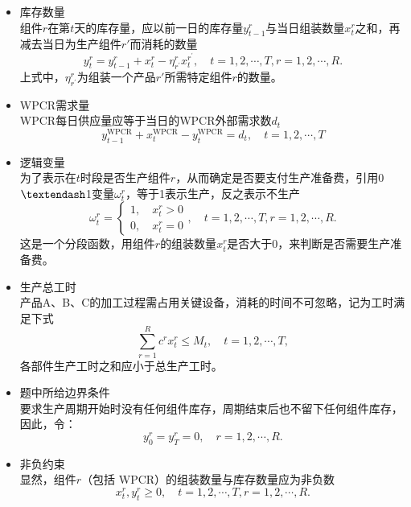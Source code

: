 \begin{itemize}
	\item 库存数量\\
	组件$r$在第$t$天的库存量，应以前一日的库存量$y_{t-1}^{r}$与当日组装数量$x_{t}^{r}$之和，再减去当日为生产组件$r'$而消耗的数量
	\begin{equation}
		y_{t}^{r}=y_{t-1}^{r}+x_{t}^{r}-\eta_{r^{\prime}}^{r} x_{t}^{r^{\prime}},\quad t=1,2, \cdots, T, r=1,2, \cdots, R.
	\end{equation}
	上式中，$\eta_{r^{\prime}}^{r}$为组装一个产品$r'$所需特定组件$r$的数量。

	\item WPCR需求量\\
	WPCR每日供应量应等于当日的WPCR外部需求数$d_t$
	\begin{equation}
		y_{t-1}^{\mathrm{WPCR}}+x_{t}^{\mathrm{WPCR}}-y_{t}^{\mathrm{WPCR}}=d_{t}, \quad t=1,2, \cdots, T
	\end{equation}

	\item 逻辑变量\\
	为了表示在$t$时段是否生产组件$r$，从而确定是否要支付生产准备费，引用0$\textendash$1变量$\omega_{t}^{r}$，等于1表示生产，反之表示不生产
	\begin{equation}\label{key1}
		\omega_{t}^{r}=\left\{\begin{array}{l}
		1, \quad x_{t}^{r}>0 \\
		0, \quad x_{t}^{r}=0
		\end{array},\quad t=1,2, \cdots, T, r=1,2, \cdots, R.\right.
	\end{equation}
	这是一个分段函数，用组件$r$的组装数量$x_{t}^{r}$是否大于0，来判断是否需要生产准备费。

	\item 生产总工时\\
	产品A、B、C的加工过程需占用关键设备，消耗的时间不可忽略，记为工时满足下式
	\begin{equation}\label{key2}
		\sum_{r=1}^{R} c^{r} x_{t}^{r} \leqslant M_{t},\quad t=1,2, \cdots, T,
	\end{equation}
	各部件生产工时之和应小于总生产工时。

	\item 题中所给边界条件\\
	要求生产周期开始时没有任何组件库存，周期结束后也不留下任何组件库存，因此，令：
	\begin{equation}
		y_{0}^{r}=y_{T}^{r}=0,\quad  r=1,2, \cdots, R.
	\end{equation}

	\item 非负约束\\
	显然，组件$r$（包括 WPCR）的组装数量与库存数量应为非负数
	\begin{equation}
		x_{t}^{r},  y_{t}^{r} \geqslant 0, \quad t=1,2, \cdots, T, r=1,2, \cdots, R.
	\end{equation}
\end{itemize}

